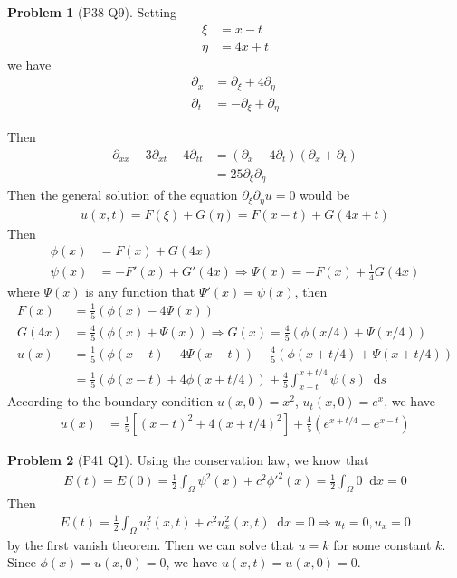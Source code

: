 \documentclass[twoside,11pt]{article}
\renewcommand*\d{\mathop{}\!\mathrm{d}}
\theoremstyle{definition}
\newtheorem{problem}{Problem}
\theoremstyle{remark}
\begin{document}
\begin{problem}[P38 Q9]
Setting 
\begin{align*}
    \xi &= x-t\\
    \eta &= 4x+t
\end{align*}
we have
\begin{align*}
    \partial_x &= \partial_\xi + 4\partial_\eta\\
    \partial_t &= -\partial_\xi + \partial_\eta
\end{align*}
\end{problem}
Then 
\begin{align*}
    \partial_{xx} - 3\partial_{xt} - 4\partial_{tt} &=
    (\partial_x - 4\partial_t)(\partial_x+\partial_t)\\
    &= 25 \partial_\xi \partial_\eta
\end{align*}
Then the general solution of the equation $\partial_\xi\partial_\eta u = 0$ would be
\begin{align*}
    u(x, t) = F(\xi) + G(\eta) = F(x-t) + G(4x+t)
\end{align*}
Then
\begin{align*}
    \phi(x) &= F(x) + G(4x)\\
    \psi(x) &= -F'(x) + G'(4x)\Rightarrow \Psi(x) = -F(x) + \frac{1}{4}G(4x)
\end{align*}
where $\Psi(x)$ is any function that $\Psi'(x)=\psi(x)$, then
\begin{align*}
    F(x) &= \frac{1}{5}(\phi(x) - 4\Psi(x))\\
    G(4x) &= \frac{4}{5}(\phi(x) + \Psi(x)) \Rightarrow G(x) = \frac{4}{5}(\phi(x/4) + \Psi(x/4)) \\
    u(x) &= \frac{1}{5}(\phi(x-t) - 4\Psi(x-t)) + \frac{4}{5}(\phi(x+t/4) + \Psi(x+t/4))\\
    &= \frac{1}{5}(\phi(x-t)+4\phi(x+t/4)) + \frac{4}{5}\int_{x-t}^{x+t/4}\psi(s)\d s
\end{align*}
According to the boundary condition $u(x, 0)=x^2$, $u_t(x, 0)=e^x$, we have
\begin{align*}
    u(x) &= \frac{1}{5}[(x-t)^2+4(x+t/4)^2] + \frac{4}{5}(e^{x+t/4} - e^{x-t})
\end{align*}

\begin{problem}[P41 Q1]
    Using the conservation law, we know that
    \begin{align*}
        E(t) = E(0) = \frac{1}{2}\int_\Omega \psi^2(x) + c^2{\phi'}^2(x) 
        = \frac{1}{2}\int_\Omega 0\d x = 0
    \end{align*}
    Then
    \begin{align*}
        E(t) = \frac{1}{2}\int_\Omega u_t^2(x, t) + c^2u_x^2(x,t) \d x = 0
        \Rightarrow u_t = 0, u_x = 0
    \end{align*}
    by the first vanish theorem.
    Then we can solve that $u=k$ for some constant $k$.
    Since $\phi(x)=u(x,0)=0$, we have $u(x,t)=u(x,0)=0$.
\end{problem}





\end{document}
